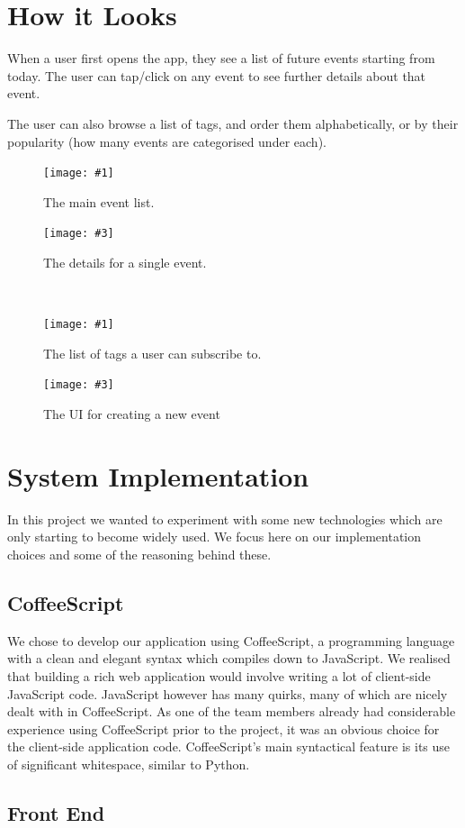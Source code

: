 \documentclass[11pt]{article}
\newcommand{\twofigure}[4]{
\begin{minipage}{0.45\textwidth}
    \centering
    \texttt{[image: \#1]}
    \caption{#2}
\end{minipage}
\begin{minipage}{0.45\textwidth}
    \centering
    \texttt{[image: \#3]}
    \caption{#4}
\end{minipage}
}
\begin{document}
\section{How it Looks}

When a user first opens the app, they see a list of future events starting from today. The user can tap/click on any event to see further details about that event.

The user can also browse a list of tags, and order them alphabetically, or by their popularity (how many events are categorised under each).


\begin{figure}[H]
\twofigure{images/event-list.png}{The main event list.}{images/event-detail.png}{The details for a single event.}
\\[2em]
\end{figure}
\begin{figure}[H]
\twofigure{images/tag-list.png}{The list of tags a user can subscribe to.}{images/new-event.png}{The UI for creating a new event}
\end{figure}


\section {System Implementation}

In this project we wanted to experiment with some new technologies which are only starting to become widely used. We focus here on our implementation choices and some of the reasoning behind these.

\subsection{CoffeeScript}

We chose to develop our application using CoffeeScript, a programming language with a clean and elegant syntax which compiles down to JavaScript. We realised that building a rich web application would involve writing a lot of client-side JavaScript code. JavaScript however has many quirks, many of which are nicely dealt with in CoffeeScript. As one of the team members already had considerable experience using CoffeeScript prior to the project, it was an obvious choice for the client-side application code. CoffeeScript's main syntactical feature is its use of significant whitespace, similar to Python.

\subsection {Front End}
\end{document}

